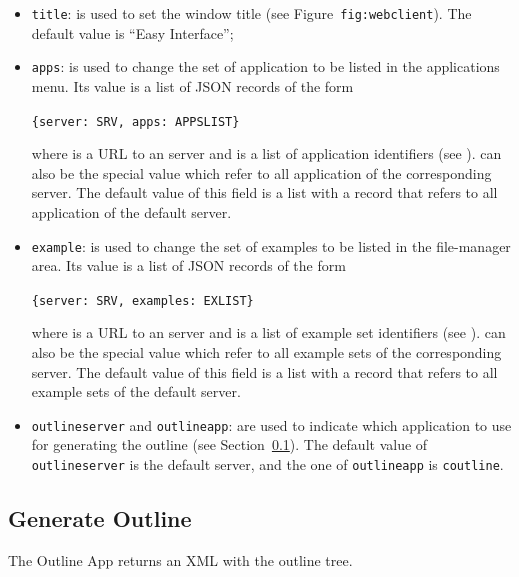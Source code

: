 \begin{itemize}

\item \texttt{title}: is used to set the window title (see
  Figure~\texttt{fig:webclient}). The default value is ``Easy
  Interface'';

\item \texttt{apps}: is used to change the set of application to be
  listed in the applications menu. Its value is a list of JSON records
  of the form
%
  \begin{center}
    \texttt{\{server: SRV, apps: APPSLIST\}} 
  \end{center}
  where  is a URL to an \ei server and  is a
  list of application identifiers (see
  ).  can also be the special
  value  which refer to all application of the corresponding
  server. The default value of this field is a list with a record that
  refers to all application of the default server.

\item \texttt{example}: is used to change the set of examples to be
  listed in the file-manager area. Its value is a list of JSON records
  of the form
%
  \begin{center}
    \texttt{\{server: SRV, examples: EXLIST\}} 
  \end{center}
  where  is a URL to an \ei server and  is a list
  of example set identifiers (see
  ).  can also be the special
  value  which refer to all example sets of the
  corresponding server. The default value of this field is a list with
  a record that refers to all example sets of the default server.

\item \texttt{outlineserver} and \texttt{outlineapp}: are used to
  indicate which application to use for generating the outline (see
  Section~\ref{ch:clients:web:outline}). The default value of
  \texttt{outlineserver} is the default server, and the one of
  \texttt{outlineapp} is \texttt{coutline}.

\end{itemize}

\subsection{Generate Outline}
\label{ch:clients:web:outline}

The Outline App returns an XML with the outline tree.

